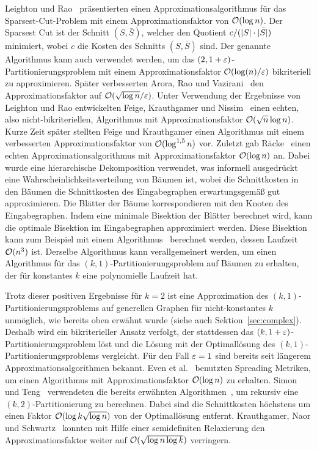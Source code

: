 Leighton und Rao~\cite{LR99} präsentierten einen Approximationsalgorithmus für das Sparsest-Cut-Problem mit einem Approximationsfaktor von $\mathcal{O}(\log n)$.
Der Sparsest Cut ist der Schnitt $(S, \bar{S})$, welcher den Quotient $c/(\lvert S\rvert \cdot  \lvert\bar{S}\rvert)$ minimiert, wobei $c$ die Kosten des Schnitts $(S, \bar{S})$ sind.
Der genannte Algorithmus kann auch verwendet werden, um das $(2, 1 + \varepsilon)$\hyp Partitionierungsproblem mit einem Approximationsfaktor $\mathcal{O}(\log(n)/\varepsilon)$ bikriteriell zu approximieren.
Später verbesserten Arora, Rao und Vazirani~\cite{ARV09} den Approximationsfaktor auf $\mathcal{O}(\sqrt{\log n}/\varepsilon)$.
Unter Verwendung der Ergebnisse von Leighton und Rao entwickelten Feige, Krauthgamer und Nissim~\cite{FKN00} einen echten, also nicht-bikriteriellen, Algorithmus mit Approximationsfaktor $\mathcal{O}(\sqrt{n} \log n)$.
Kurze Zeit später stellten Feige und Krauthgamer einen Algorithmus mit einem verbesserten Approximationsfaktor von $\mathcal{O}(\log^{1,5} n)$ vor.
Zuletzt gab Räcke~\cite{rc08} einen echten Approximationsalgorithmus mit Approximationsfaktor $\mathcal{O}(\log n)$ an.
Dabei wurde eine hierarchische Dekomposition verwendet, was informell ausgedrückt eine Wahrscheinlichkeitsverteilung von Bäumen ist, wobei die Schnittkosten in den Bäumen die Schnittkosten des Eingabegraphen erwartungsgemäß gut approximieren.
Die Blätter der Bäume korrespondieren mit den Knoten des Eingabegraphen.
Indem eine minimale Bisektion der Blätter berechnet wird, kann die optimale Bisektion im Eingabegraphen approximiert werden.
Diese Bisektion kann zum Beispiel mit einem Algorithmus~\cite{mcg78, ws11} berechnet werden, dessen Laufzeit $\mathcal{O}(n^3)$ ist.
Derselbe Algorithmus kann verallgemeinert werden, um einen Algorithmus für das $(k, 1)$\hyp Partitionierungsproblem auf Bäumen zu erhalten, der für konstantes $k$ eine polynomielle Laufzeit hat.

Trotz dieser positiven Ergebnisse für $k=2$ ist eine Approximation des $(k, 1)$\hyp Partitionierungsproblems auf generellen Graphen für nicht-konstantes $k$ unmöglich, wie bereits oben erwähnt wurde (siehe auch Sektion~\ref{sec:complex}).
Deshalb wird ein bikriterieller Ansatz verfolgt, der stattdessen das $(k,1+\varepsilon)$\hyp Partitionierungsproblem löst und die Lösung mit der Optimallösung des $(k, 1)$\hyp Partitionierungsproblems vergleicht.
Für den Fall $\varepsilon = 1$ sind bereits seit längerem Approximationsalgorithmen bekannt.
Even et al.~\cite{ENR+97} benutzten Spreading Metriken, um einen Algorithmus mit Approximationsfaktor $\mathcal{O}(\log n)$ zu erhalten.
Simon und Teng~\cite{ST97} verwendeten die bereits erwähnten Algorithmen~\cite{LR99, ARV09}, um rekursiv eine $(k, 2)$\hyp Partitionierung zu berechnen.
Dabei sind die Schnittkosten höchstens um einen Faktor $\mathcal{O}(\log k \sqrt{\log n})$ von der Optimallösung entfernt.
Krauthgamer, Naor und Schwartz~\cite{KNS09} konnten mit Hilfe einer semidefiniten Relaxierung den Approximationsfaktor weiter auf $\mathcal{O}(\sqrt{\log n \log k})$ verringern.

